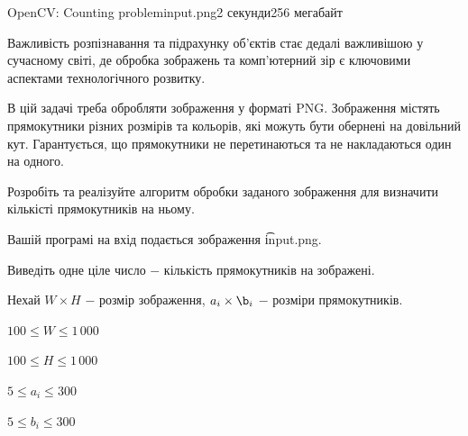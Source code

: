 \begin{problem}{OpenCV: Counting problem}{input.png}{}{2 секунди}{256 мегабайт}

Важливість розпізнавання та підрахунку об'єктів стає дедалі важливішою у сучасному світі, 
де обробка зображень та комп'ютерний зір є ключовими аспектами технологічного розвитку.

В цій задачі треба обробляти зображення у форматі PNG.
Зображення містять прямокутники різних розмірів та кольорів, які можуть бути обернені на довільний кут.
Гарантується, що прямокутники не перетинаються та не накладаються один на одного.

Розробіть та реалізуйте алгоритм обробки заданого зображення для визначити кількісті прямокутників на ньому.

\InputFile
Вашій програмі на вхід подається зображення \t{input.png}.  

\OutputFile
Виведіть одне ціле число $-$ кількість прямокутників на зображені.

\Constraints
Нехай $W \times H$ $-$ розмір зображення, $a_i \times \b_i$ $-$ розміри прямокутників.

$100 \le W \le 1\,000$

$100 \le H \le 1\,000$

$5 \le a_i \le 300$

$5 \le b_i \le 300$




\Examples
\begin{example}
%
\end{example}

\end{problem}

